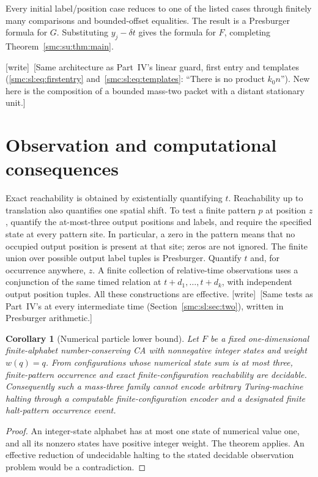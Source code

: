 \documentclass[11pt,letterpaper]{article}
\numberwithin{equation}{section}
\newtheorem{corollary}[theorem]{Corollary}
\theoremstyle{definition}
\theoremstyle{remark}
\newcommand{\wtag}{\textup{[write]}}
\begin{document}
Every initial label/position case reduces to one of the listed cases through
finitely many comparisons and bounded-offset equalities. The result is a
Presburger formula for $G$. Substituting $y_j-\delta t$ gives the formula for
$F$, completing Theorem~\ref{smc:su:thm:main}.

\wtag\ [Same architecture as Part~IV's linear guard, first entry and templates (\eqref{smc:sl:eq:firstentry} and~\eqref{smc:sl:eq:templates}: ``There is no product $k_0n$''). New here is the composition of a bounded mass-two packet with a distant stationary unit.]

\section{Observation and computational consequences}\label{smc:su:sec:observation}

Exact reachability is obtained by existentially quantifying $t$. Reachability
up to translation also quantifies one spatial shift. To test a finite pattern
$p$ at position $z$, quantify the at-most-three output positions and labels,
and require the specified state at every pattern site. In particular, a zero
in the pattern means that no occupied output position is present at that site;
zeros are not ignored. The finite union over possible output label tuples is
Presburger. Quantify $t$ and, for occurrence anywhere, $z$.
A finite collection of relative-time observations uses a conjunction of the
same timed relation at $t+d_1,\ldots,t+d_k$, with independent output position
tuples. All these constructions are effective.
\wtag\ [Same tests as Part~IV's at every intermediate time (Section~\ref{smc:sl:sec:two}), written in Presburger arithmetic.]

\begin{corollary}[Numerical particle lower bound]\label{smc:su:cor:numerical}
Let $F$ be a fixed one-dimensional finite-alphabet number-conserving CA with
nonnegative integer states and weight $w(q)=q$. From configurations whose
numerical state sum is at most three, finite-pattern occurrence and exact
finite-configuration reachability are decidable.
Consequently such a mass-three family cannot encode arbitrary Turing-machine
halting through a computable finite-configuration encoder and a designated
finite halt-pattern occurrence event.
\end{corollary}
\begin{proof}
An integer-state alphabet has at most one state of numerical value one, and
all its nonzero states have positive integer weight. The theorem applies. An
effective reduction of undecidable halting to the stated decidable observation
problem would be a contradiction.
\end{proof}
\end{document}
